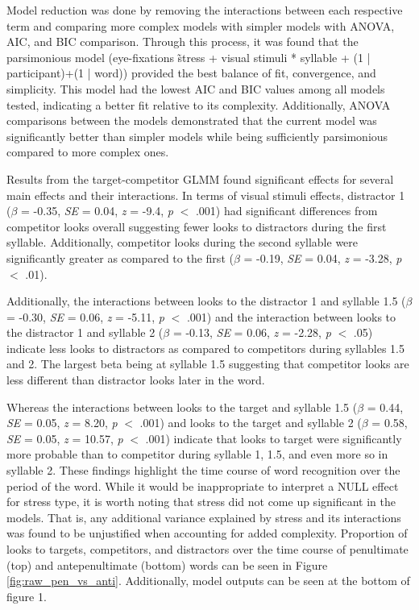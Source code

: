 Model reduction was done by removing the interactions between each respective term and comparing more complex models with simpler models with ANOVA, AIC, and BIC comparison. Through this process, it was found that the parsimonious model (eye-fixations \~ stress + visual stimuli * syllable + (1 | participant)+(1 | word)) provided the best balance of fit, convergence, and simplicity. This model had the lowest AIC and BIC values among all models tested, indicating a better fit relative to its complexity. Additionally, ANOVA comparisons between the models demonstrated that the current model was significantly better than simpler models while being sufficiently parsimonious compared to more complex ones.

Results from the target-competitor GLMM found significant effects for several main effects and their interactions. In terms of visual stimuli effects, distractor 1 ($\beta$ = -0.35, \textit{SE} = 0.04, \textit{z} = -9.4, \textit{p} $<$ .001) had significant differences from competitor looks overall suggesting fewer looks to distractors during the first syllable. Additionally, competitor looks during the second syllable were significantly greater as compared to the first ($\beta$ = -0.19, \textit{SE} = 0.04, \textit{z} = -3.28, \textit{p} $<$ .01).

Additionally, the interactions between looks to the distractor 1 and syllable 1.5 ($\beta$ = -0.30, \textit{SE} = 0.06, \textit{z} = -5.11, \textit{p} $<$ .001) and the interaction between looks to the distractor 1 and syllable 2 ($\beta$ = -0.13, \textit{SE} = 0.06, \textit{z} = -2.28, \textit{p} $<$ .05) indicate less looks to distractors as compared to competitors during syllables 1.5 and 2. The largest beta being at syllable 1.5 suggesting that competitor looks are less different than distractor looks later in the word.

Whereas the interactions between looks to the target and syllable 1.5 ($\beta$ = 0.44, \textit{SE} = 0.05, \textit{z} = 8.20, \textit{p} $<$ .001) and looks to the target and syllable 2 ($\beta$ = 0.58, \textit{SE} = 0.05, \textit{z} = 10.57, \textit{p} $<$ .001) indicate that looks to target were significantly more probable than to competitor during syllable 1, 1.5, and even more so in syllable 2. These findings highlight the time course of word recognition over the period of the word. While it would be inappropriate to interpret a NULL effect for stress type, it is worth noting that stress did not come up significant in the models. That is, any additional variance explained by stress and its interactions was found to be unjustified when accounting for added complexity. Proportion of looks to targets, competitors, and distractors over the time course of penultimate (top) and antepenultimate (bottom) words can be seen in Figure \ref{fig:raw_pen_vs_anti}. Additionally, model outputs can be seen at the bottom of figure 1.


